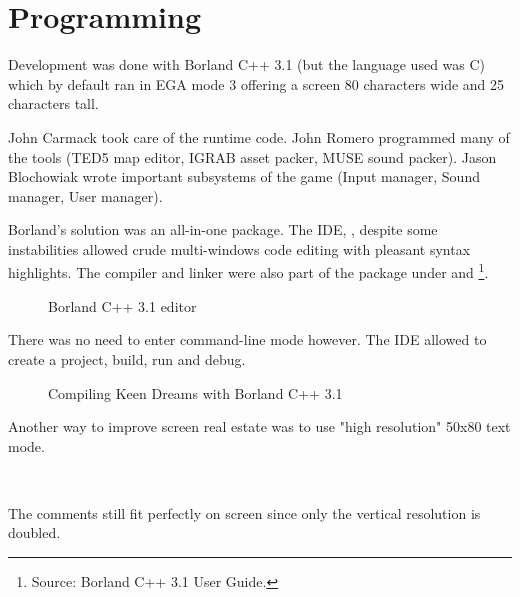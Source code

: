 \documentclass[book.tex]{subfiles}
\begin{document}
\section{Programming}
\label{section:programming}



Development was done with Borland C++ 3.1 (but the language used was C) which by default ran in EGA mode 3 offering a screen 80 characters wide and 25 characters tall.\\
\par
John Carmack took care of the runtime code. John Romero programmed many of the tools (TED5 map editor, IGRAB asset packer, MUSE sound packer). Jason Blochowiak wrote important subsystems of the game (Input manager, Sound manager, User manager).\\
\par
Borland's solution was an all-in-one package. The IDE, , despite some instabilities allowed crude multi-windows code editing with pleasant syntax highlights. The compiler and linker were also part of the package under  and \footnote{Source: Borland C++ 3.1 User Guide.}.\\

\begin{figure}[H]
\centering
\caption{Borland C++ 3.1 editor}
\end{figure}
\par

\pagebreak


There was no need to enter command-line mode however. The IDE allowed to create a project, build, run and debug.\\
\par
\begin{figure}[H]
\centering
  \caption{Compiling Keen Dreams with Borland C++ 3.1}
\end{figure}






Another way to improve screen real estate was to use "high resolution" 50x80 text mode.\\
\par 
 \\
 \par
 \vspace{-7pt}
The comments still fit perfectly on screen since only the vertical resolution is doubled.\\
\par
\vspace{-4pt}
 
\end{document}
